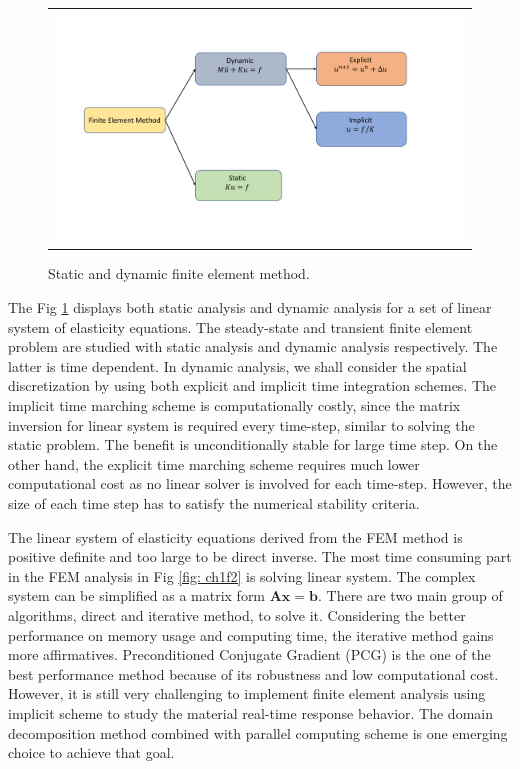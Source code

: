 \begin{figure}[H]
	\centering
	\begin{tabular}{c}
		\includegraphics[width=1.0\textwidth]{./pics/fem}
	\end{tabular}
	\caption{\footnotesize Static and dynamic finite element method.} \label{fig: ch1f3}
\end{figure}

The Fig \ref{fig: ch1f3} displays both static analysis and dynamic analysis for a set of linear system of elasticity equations. The steady-state and transient finite element problem are studied with static analysis and dynamic analysis respectively. The latter is time dependent. In dynamic analysis, we shall consider the spatial discretization by using both explicit and implicit time integration schemes\cite{bathe2008finite}. The implicit time marching scheme is computationally costly, since the matrix inversion for linear system is required every time-step, similar to solving the static problem. The benefit is unconditionally stable for large time step. On the other hand, the explicit time marching scheme requires much lower computational cost as no linear solver is involved for each time-step. However, the size of each time step has to satisfy the numerical stability criteria. 


The linear system of elasticity equations derived from the FEM method is positive definite and too large to be direct inverse. The most time consuming part in the FEM analysis in Fig \ref{fig: ch1f2} is solving linear system. The complex system can be simplified as a matrix form $ \mathbf{A} \mathbf{x} = \mathbf{b} $. There are two main group of algorithms, direct and iterative method, to solve it. Considering the better performance on memory usage and computing time, the iterative method gains more affirmatives\cite{brussino1989comparison}. Preconditioned Conjugate Gradient (PCG) is the one of the best performance method because of its robustness and low computational cost. However, it is still very challenging to implement finite element analysis using implicit scheme to study the material real-time response behavior. The domain decomposition method combined with parallel computing scheme is one emerging choice to achieve that goal.

